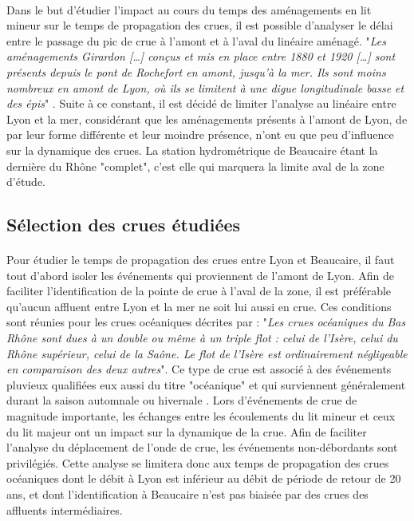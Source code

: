 \documentclass[11pt]{article}
\begin{document}
	\paragraph{} Dans le but d'étudier l'impact au cours du temps des aménagements en lit mineur sur le temps de propagation des crues, il est possible d'analyser le délai entre le passage du pic de crue à l'amont et à l'aval du linéaire aménagé. "\textit{Les aménagements Girardon […] conçus et mis en place entre 1880 et 1920 […] sont présents depuis le pont de Rochefort en amont, jusqu'à la mer. Ils sont moins nombreux en amont de Lyon, où ils se limitent à une digue longitudinale basse et des épis}" \citep{gaydou_schema_2013}. Suite à ce constant, il est décidé de limiter l'analyse au linéaire entre Lyon et la mer, considérant que les aménagements présents à l'amont de Lyon, de par leur forme différente et leur moindre présence, n'ont eu que peu d'influence sur la dynamique des crues. La station hydrométrique de Beaucaire étant la dernière du Rhône "complet", c'est elle qui marquera la limite aval de la zone d'étude.
		
	\subsection{Sélection des crues étudiées}
	
	\paragraph{} Pour étudier le temps de propagation des crues entre Lyon et Beaucaire, il faut tout d'abord isoler les événements qui proviennent de l'amont de Lyon. Afin de faciliter l'identification de la pointe de crue à l'aval de la zone, il est préférable qu'aucun affluent entre Lyon et la mer ne soit lui aussi en crue. Ces conditions sont réunies pour les crues océaniques décrites par \citet{parde_regime_1919} : "\textit{Les crues océaniques du Bas Rhône sont dues à un double ou même à un triple flot : celui de l'Isère, celui du Rhône supérieur, celui de la Saône. Le flot de l'Isère est ordinairement négligeable en comparaison des deux autres}". Ce type de crue est associé à des événements pluvieux qualifiées eux aussi du titre "océanique" et qui surviennent généralement durant la saison automnale ou hivernale \citep{parde_regime_1925}. Lors d'événements de crue de magnitude importante, les échanges entre les écoulements du lit mineur et ceux du lit majeur ont un impact sur la dynamique de la crue. Afin de faciliter l'analyse du déplacement de l'onde de crue, les événements non-débordants sont privilégiés. Cette analyse se limitera donc aux temps de propagation des crues océaniques dont le débit à Lyon est inférieur au débit de période de retour de 20 ans, et dont l'identification à Beaucaire n'est pas biaisée par des crues des affluents intermédiaires. 
	
\end{document}

